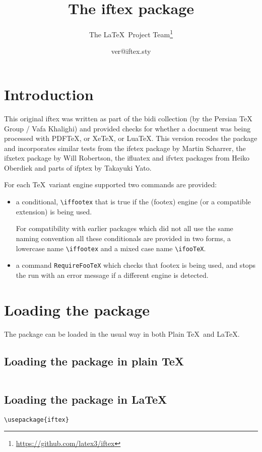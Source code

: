 \documentclass{article}
\title{The iftex package}
\author{The \LaTeX\ Project Team\thanks{%
\url{https://github.com/latex3/iftex}}}
\date{\csname ver@iftex.sty\endcsname}
\begin{document}
\maketitle
\tableofcontents


\section{Introduction}
This original \textsf{iftex} was written as part of the \textsf{bidi}
collection (by the Persian TeX Group / Vafa Khalighi) 
and provided checks for whether a document was being
processed with PDF\TeX, or Xe\TeX, or Lua\TeX. This version recodes
the package and incorporates similar tests from the \textsf{ifetex}
package by Martin Scharrer, the \textsf{ifxetex} package by Will
Robertson, the \textsf{ifluatex} and \textsf{ifvtex}
packages from Heiko Oberdiek and parts of \textsf{ifptex} by Takayuki
Yato.

For each \TeX\ variant engine supported two commands are provided:
\begin{itemize}
\item 
 a conditional, \verb|\iffootex| that is true if the \textsf(footex)
engine (or a compatible extension) is being used.

For compatibility with earlier packages which did not all use the same
naming convention all these conditionals are provided in two forms, a
lowercase name \verb|\iffootex| and a mixed case name \verb|\ifooTeX|.

\item a command \verb|RequireFooTeX| which checks that \textsf{footex}
  is being used, and stops the run with an error message if a
  different engine is detected.
\end{itemize}

\section{Loading the package}
The package can be loaded in the usual way in both Plain \TeX\ and \LaTeX.
\subsection{Loading the package in plain \TeX}
\begin{verbatim}

\end{verbatim}

\subsection{Loading the package in \LaTeX}
\begin{verbatim}
\usepackage{iftex}
\end{verbatim}
\end{document}

